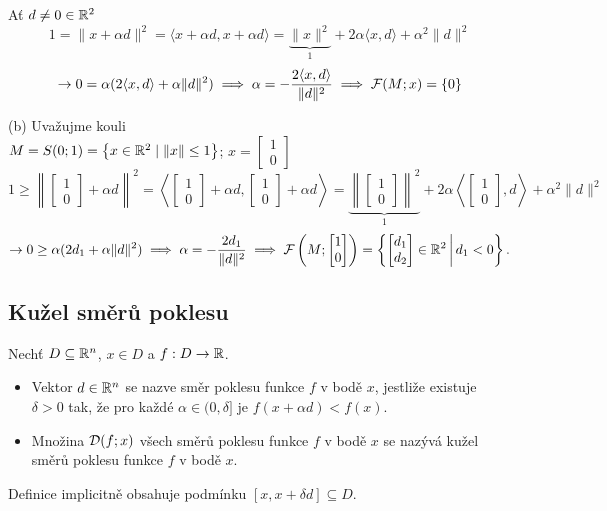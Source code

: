 Ať $d \not = 0 \in \mathbb{R}^2$
\[
    1 = \| x + \alpha d\|^2 = \langle x + \alpha d , x + \alpha d\rangle = \underbrace{\| x\|^2}_{1} + 2 \alpha
    \langle x, d\rangle + \alpha^2 \|d\|^2
\]
\[
    \rightarrow 0 = \alpha (2 \langle x, d\rangle + \alpha \| d\|^2) \implies \alpha =
    - \frac{2 \langle x,d\rangle}{\|d\|^2} \implies \mathcal{F}(M;x) = \left\lbrace 0 \right\rbrace
\]

(b) Uvažujme kouli \\
$M = S(0; 1) = \left\lbrace x \in \mathbb{R}^2 \mid \| x\| \leq 1 \right\rbrace$; $x =
\begin{bmatrix}
    1 \\
    0
\end{bmatrix}$
\[
    1 \geq \left\|
    \begin{bmatrix}
        1 \\
        0
    \end{bmatrix} + \alpha d\right\|^2 = \left\langle
        \begin{bmatrix}
        1 \\
        0
    \end{bmatrix} + \alpha d ,
    \begin{bmatrix}
        1 \\
        0
    \end{bmatrix} + \alpha d\right\rangle = \underbrace{\left\|
    \begin{bmatrix}
        1 \\
        0
    \end{bmatrix}\right\|^2}_{1} + 2 \alpha
    \left\langle
    \begin{bmatrix}
        1 \\
        0
    \end{bmatrix}, d\right\rangle + \alpha^2 \|d\|^2
\]
\[
    \rightarrow 0 \geq \alpha (2 d_1 + \alpha \| d\|^2) \implies \alpha =
    - \frac{2 d_1}{\|d\|^2} \implies \mathcal{F}\left(M;
    \begin{bmatrix}
        1 \\
        0
    \end{bmatrix}\right) = \left\lbrace 
    \begin{bmatrix}
        d_1 \\
        d_2
    \end{bmatrix} \in \mathbb{R}^2 \, \middle| \, d_1 < 0
     \right\rbrace.
\]

\subsection{Kužel směrů poklesu}
Nechť $D \subseteq \mathbb{R}^n$, $x \in D$ a $f : D \rightarrow \mathbb{R}$.
\begin{itemize}
    \item Vektor $d \in \mathbb{R}^n$ se nazve směr poklesu funkce $f$ v bodě $x$, jestliže existuje $\delta >0$ tak, že pro
    každé $\alpha \in (0, \delta]$ je $f(x + \alpha d) < f(x)$.
    \item Množina $\mathcal{D}(f; x)$ všech směrů poklesu funkce $f$ v bodě $x$ se nazývá kužel směrů poklesu funkce $f$ v bodě
    $x$.
\end{itemize}
Definice implicitně obsahuje podmínku $[x, x+\delta d] \subseteq D$.


